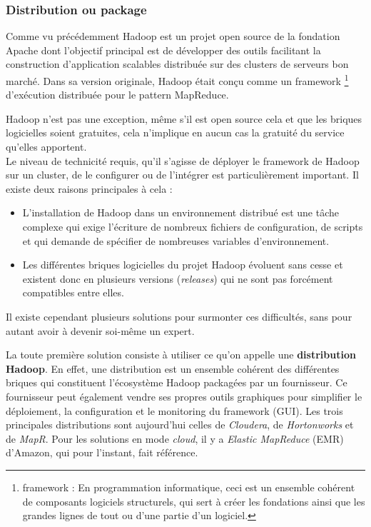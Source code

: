\documentclass[12pt]{article}
\begin{document}
\subsubsection{Distribution ou package}
Comme vu précédemment Hadoop est un projet open source de la fondation Apache dont l'objectif principal est de développer des outils facilitant la construction d'application scalables distribuée sur des clusters de serveurs bon marché. Dans sa version originale, Hadoop était conçu comme un framework \footnote{framework : En programmation informatique, ceci est un ensemble cohérent de composants logiciels structurels, qui sert à créer les fondations ainsi que les grandes lignes de tout ou d'une partie d'un logiciel.} d'exécution distribuée pour le pattern MapReduce. \par
Hadoop n'est pas une exception, même s'il est open source cela et que les briques logicielles soient gratuites, cela n'implique en aucun cas la gratuité du service qu'elles apportent. \\
Le niveau de technicité requis, qu'il s'agisse de déployer le framework de Hadoop sur un cluster, de le configurer ou de l'intégrer est particulièrement important.  Il existe deux raisons principales à cela : 
\begin{itemize}
\item L'installation de Hadoop dans un environnement distribué est une tâche complexe qui exige l'écriture de nombreux fichiers de configuration, de scripts et qui demande de spécifier de nombreuses variables d'environnement.
\item Les différentes briques logicielles du projet Hadoop évoluent sans cesse et existent donc en plusieurs versions (\emph{releases}) qui ne sont pas forcément compatibles entre elles. 
\end{itemize} 
Il existe cependant plusieurs solutions pour surmonter ces difficultés, sans pour autant avoir à devenir soi-même un expert.
\par
La toute première solution consiste à utiliser ce qu'on appelle une \textbf{distribution Hadoop}. En effet, une distribution est un ensemble cohérent des différentes briques qui constituent l'écosystème Hadoop packagées par un fournisseur. Ce fournisseur peut également vendre ses propres outils graphiques pour simplifier le déploiement, la configuration et le monitoring du framework (GUI). Les trois principales distributions sont aujourd'hui celles de \emph{Cloudera}, de \emph{Hortonworks} et de \textit{MapR}. Pour les solutions en mode \textit{cloud}, il y a \textit{Elastic MapReduce} (EMR) d'Amazon, qui pour l'instant, fait référence.\par
\end{document}
